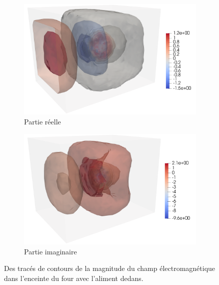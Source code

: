 \begin{figure}[H]
    \centering
    \begin{subfigure}{.5\textwidth}
        \centering
        \includegraphics[scale=0.15]{figures/helmholtz/helmholtz_reel2.png}
        \caption{Partie réelle}
    \end{subfigure}%
    \begin{subfigure}{.5\textwidth}
        \centering
        \includegraphics[scale=0.15]{figures/helmholtz/helmholtz_imag2.png}
        \caption{Partie imaginaire}
    \end{subfigure}
    \caption{Des tracés de contours de la magnitude du champ électromagnétique
    dans l'enceinte du four avec l'aliment dedans.}
\end{figure}

